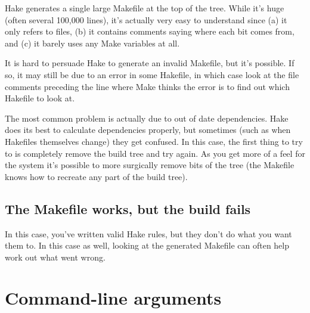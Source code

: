 \documentclass[a4paper,twoside]{report} %
\begin{document}
Hake generates a single large Makefile at the top of the tree.
While it's huge (often several 100,000 lines), it's actually very easy to
understand
since (a) it only refers to files, (b) it contains comments saying
where each bit comes from, and (c) it barely uses any
Make variables at all.

It is hard to persuade Hake to generate an invalid Makefile,
but it's possible.  If so, it may still be due to an error in some
Hakefile, in which case look at the file comments preceding the line
where Make thinks the error is to find out which Hakefile to look
at.

The most common problem is actually due to out of date dependencies.
Hake does its best to calculate dependencies properly, but sometimes
(such as when Hakefiles themselves change) they get confused.  In this
case, the first thing to try to is completely remove the build tree
and try again.  As you get more of a feel for the system it's possible
to more surgically remove bits of the tree (the Makefile knows how to
recreate any part of the build tree).

\section{The Makefile works, but the build fails}

In this case, you've written valid Hake rules, but they don't do what
you want them to.  In this case as well, looking at the generated Makefile
can often help work out what went wrong.

\chapter{Command-line arguments}
\end{document}
